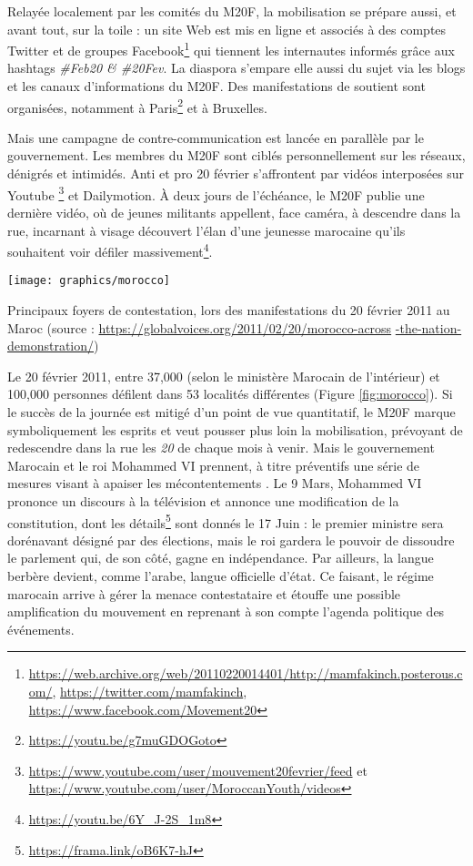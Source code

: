 \documentclass[symmetric,justified,marginals=raggedouter]{tufte-book}
\begin{document}
Relayée localement par les comités du M20F, la mobilisation se prépare aussi, et avant tout, sur la toile : un site Web est mis en ligne et associés à des comptes Twitter et de groupes Facebook\footnote{\url{https://web.archive.org/web/20110220014401/http://mamfakinch.posterous.com/}, \url{https://twitter.com/mamfakinch}, \url{https://www.facebook.com/Movement20}} qui tiennent les internautes informés grâce aux hashtags \textit{\#Feb20 \& \#20Fev}. La diaspora s'empare elle aussi du sujet via les blogs et les canaux d'informations du M20F. Des manifestations de soutient sont organisées, notamment à Paris\footnote{\url{https://youtu.be/g7muGDOGoto}} et à Bruxelles. 

Mais une campagne de contre-communication est lancée en parallèle par le gouvernement. Les membres du M20F sont ciblés personnellement sur les réseaux, dénigrés et intimidés. Anti et pro 20 février s'affrontent par vidéos interposées sur Youtube \footnote{\url{https://www.youtube.com/user/mouvement20fevrier/feed} et \url{https://www.youtube.com/user/MoroccanYouth/videos}} et Dailymotion. À deux jours de l'échéance, le M20F publie une dernière vidéo, où de jeunes militants appellent, face caméra, à descendre dans la rue, incarnant à visage découvert l'élan d'une jeunesse marocaine qu'ils souhaitent voir défiler massivement\footnote{\url{https://youtu.be/6Y_J-2S_1m8}}.

\begin{marginfigure}%
  \texttt{[image: graphics/morocco]}
  \vspace*{0.2cm}  
  \caption{Principaux foyers de contestation, lors des manifestations du 20 février 2011 au Maroc (source : \url{ https://globalvoices.org/2011/02/20/morocco-across} \url{-the-nation-demonstration/}) }
  \label{fig:morocco}
\end{marginfigure} 

Le 20 février 2011, entre 37,000 (selon le ministère Marocain de l'intérieur) et 100,000 personnes défilent dans 53 localités différentes (Figure \ref{fig:morocco}). Si le succès de la journée est mitigé d'un point de vue quantitatif, le M20F marque symboliquement les esprits et veut pousser plus loin la mobilisation, prévoyant de redescendre dans la rue les \textit{20} de chaque mois à venir. Mais le gouvernement Marocain et le roi Mohammed VI prennent, à titre préventifs une série de mesures visant à apaiser les mécontentements \citep{desrues_mouvement_2012}. Le 9 Mars, Mohammed VI prononce un discours à la télévision et annonce une modification de la constitution, dont les détails\footnote{\url{https://frama.link/oB6K7-hJ}} sont donnés le 17 Juin : le premier ministre sera dorénavant désigné par des élections, mais le roi gardera le pouvoir de dissoudre le parlement qui, de son côté, gagne en indépendance. Par ailleurs, la langue berbère devient, comme l'arabe, langue officielle d'état. Ce faisant, le régime marocain arrive à gérer la menace contestataire et étouffe une possible amplification du mouvement en reprenant à son compte l'agenda politique des événements. 
\end{document}
